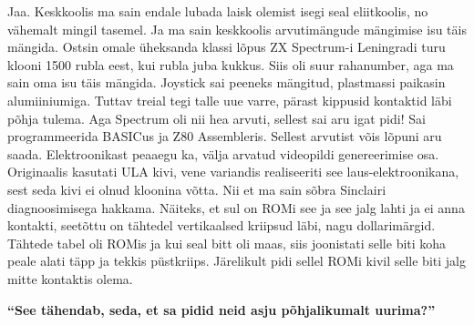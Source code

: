 Jaa. Keskkoolis ma sain endale lubada laisk olemist isegi seal eliitkoolis, no
vähemalt mingil tasemel. Ja ma sain keskkoolis arvutimängude mängimise isu täis
mängida. Ostsin omale üheksanda klassi lõpus ZX Spectrum-i Leningradi turu klooni 1500 rubla eest,
kui rubla juba kukkus. Siis oli suur rahanumber, aga ma sain oma isu täis
mängida. Joystick
sai peeneks mängitud, plastmassi paikasin alumiiniumiga. Tuttav treial tegi
talle uue varre, pärast kippusid kontaktid läbi põhja tulema. Aga Spectrum oli
nii hea arvuti, sellest sai aru igat pidi! Sai programmeerida BASICus ja Z80
Assembleris. Sellest arvutist võis lõpuni aru saada.
Elektroonikast peaaegu ka, välja arvatud videopildi genereerimise osa.
Originaalis kasutati ULA kivi, vene variandis realiseeriti see
laus-elektroonikana, sest seda kivi ei
olnud kloonina võtta. Nii et ma sain sõbra Sinclairi diagnoosimisega hakkama.
Näiteks, et sul on ROMi see ja see jalg lahti ja ei anna kontakti, seetõttu on
tähtedel vertikaalsed kriipsud läbi, nagu dollarimärgid. Tähtede tabel oli
ROMis ja kui seal bitt oli maas, siis joonistati selle biti koha peale alati
täpp ja tekkis püstkriips. Järelikult pidi sellel ROMi kivil selle biti jalg
mitte kontaktis olema.

\textbf{\enquote{See tähendab, seda, et sa pidid neid asju põhjalikumalt
uurima?}}

